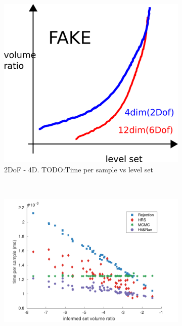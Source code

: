 \documentclass[letterpaper, 10 pt, conference]{ieeeconf}  %
\begin{document}
\begin{figure}[t!]
	\centering
	\begin{subfigure}[b]{0.48\linewidth}
		\includegraphics[width=\linewidth]{fig/sampling_efficiency/levelset}
		\caption{2DoF - 4D. TODO:Time per sample vs level set}
		\label{fig:sampling_efficiency:levelset}
	\end{subfigure}
	 \\
	\begin{subfigure}[b]{0.78\linewidth}
		\includegraphics[width=\linewidth]{fig/sampling_efficiency/sample_efficiency_2d}

\end{subfigure}
\end{figure}
\end{document}
